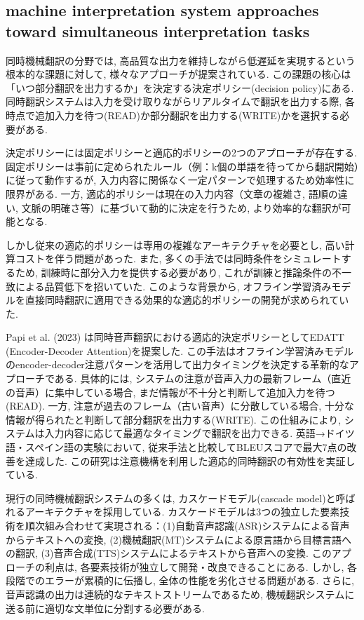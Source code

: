 \subsection{machine interpretation system approaches toward simultaneous interpretation tasks}

同時機械翻訳の分野では, 高品質な出力を維持しながら低遅延を実現するという根本的な課題に対して, 様々なアプローチが提案されている.
この課題の核心は「いつ部分翻訳を出力するか」を決定する決定ポリシー(decision policy)にある.
同時翻訳システムは入力を受け取りながらリアルタイムで翻訳を出力する際, 各時点で追加入力を待つ(READ)か部分翻訳を出力する(WRITE)かを選択する必要がある.

決定ポリシーには固定ポリシーと適応的ポリシーの2つのアプローチが存在する.
固定ポリシーは事前に定められたルール（例：k個の単語を待ってから翻訳開始）に従って動作するが, 入力内容に関係なく一定パターンで処理するため効率性に限界がある.
一方, 適応的ポリシーは現在の入力内容（文章の複雑さ, 語順の違い, 文脈の明確さ等）に基づいて動的に決定を行うため, より効率的な翻訳が可能となる.

しかし従来の適応的ポリシーは専用の複雑なアーキテクチャを必要とし, 高い計算コストを伴う問題があった.
また, 多くの手法では同時条件をシミュレートするため, 訓練時に部分入力を提供する必要があり, これが訓練と推論条件の不一致による品質低下を招いていた.
このような背景から, オフライン学習済みモデルを直接同時翻訳に適用できる効果的な適応的ポリシーの開発が求められていた.

Papi et al. (2023) \cite{papi2023attention}は同時音声翻訳における適応的決定ポリシーとしてEDATT (Encoder-Decoder Attention)を提案した.
この手法はオフライン学習済みモデルのencoder-decoder注意パターンを活用して出力タイミングを決定する革新的なアプローチである.
具体的には, システムの注意が音声入力の最新フレーム（直近の音声）に集中している場合, まだ情報が不十分と判断して追加入力を待つ(READ).
一方, 注意が過去のフレーム（古い音声）に分散している場合, 十分な情報が得られたと判断して部分翻訳を出力する(WRITE).
この仕組みにより, システムは入力内容に応じて最適なタイミングで翻訳を出力できる.
英語→ドイツ語・スペイン語の実験において, 従来手法と比較してBLEUスコアで最大7点の改善を達成した.
この研究は注意機構を利用した適応的同時翻訳の有効性を実証している.

現行の同時機械翻訳システムの多くは, カスケードモデル(cascade model)と呼ばれるアーキテクチャを採用している.
カスケードモデルは3つの独立した要素技術を順次組み合わせて実現される：(1)自動音声認識(ASR)システムによる音声からテキストへの変換, (2)機械翻訳(MT)システムによる原言語から目標言語への翻訳, (3)音声合成(TTS)システムによるテキストから音声への変換.
このアプローチの利点は, 各要素技術が独立して開発・改良できることにある.
しかし, 各段階でのエラーが累積的に伝播し, 全体の性能を劣化させる問題がある.
さらに, 音声認識の出力は連続的なテキストストリームであるため, 機械翻訳システムに送る前に適切な文単位に分割する必要がある.


